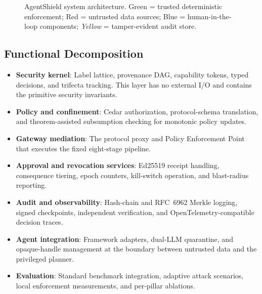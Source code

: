 \documentclass[10pt,conference]{IEEEtran}
\begin{document}
\begin{figure}[t]
\caption{AgentShield system architecture.
\textcolor{green!60!black}{Green} = trusted deterministic enforcement;
\textcolor{red!60!black}{Red} = untrusted data sources;
\textcolor{blue!60!black}{Blue} = human-in-the-loop components;
\textit{Yellow} = tamper-evident audit store.}
\label{fig:architecture}
\end{figure}

\subsection{Functional Decomposition}
\begin{itemize}
  \item \textbf{Security kernel}: Label lattice, provenance DAG, capability
        tokens, typed decisions, and trifecta tracking. This layer has no
        external I/O and contains the primitive security invariants.
  \item \textbf{Policy and confinement}: Cedar authorization, protocol-schema
        translation, and theorem-assisted subsumption checking for monotonic
        policy updates.
  \item \textbf{Gateway mediation}: The protocol proxy and Policy Enforcement
        Point that executes the fixed eight-stage pipeline.
  \item \textbf{Approval and revocation services}: Ed25519 receipt handling,
        consequence tiering, epoch counters, kill-switch operation, and
        blast-radius reporting.
  \item \textbf{Audit and observability}: Hash-chain and RFC~6962 Merkle
        logging, signed checkpoints, independent verification, and
        OpenTelemetry-compatible decision traces.
  \item \textbf{Agent integration}: Framework adapters, dual-LLM quarantine,
        and opaque-handle management at the boundary between untrusted data
        and the privileged planner.
  \item \textbf{Evaluation}: Standard benchmark integration, adaptive attack
        scenarios, local enforcement measurements, and per-pillar ablations.
\end{itemize}
\end{document}
